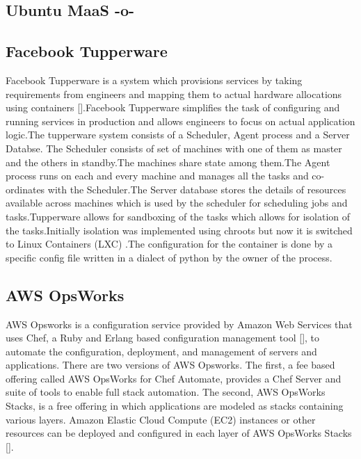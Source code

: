 \subsection{Ubuntu MaaS -o-}



\subsection{Facebook Tupperware}

Facebook Tupperware is a system which provisions services by taking
requirements from engineers and mapping them to actual hardware
allocations using containers [\cite{www-FaceTup}].Facebook Tupperware
simplifies the task of configuring and running services in production
and allows engineers to focus on actual application logic.The
tupperware system consists of a Scheduler, Agent process and a Server
Databse.  The Scheduler consists of set of machines with one of them
as master and the others in standby.The machines share state among
them.The Agent process runs on each and every machine and manages all
the tasks and co-ordinates with the Scheduler.The Server database
stores the details of resources available across machines which is
used by the scheduler for scheduling jobs and tasks.Tupperware allows
for sandboxing of the tasks which allows for isolation of the
tasks.Initially isolation was implemented using chroots but now it is
switched to Linux Containers (LXC) .The configuration for the
container is done by a specific config file written in a dialect of
python by the owner of the process.

\subsection{AWS OpsWorks}

AWS Opsworks is a configuration service provided by Amazon Web
Services that uses Chef, a Ruby and Erlang based configuration
management tool [\cite{www-wikichef}], to automate the configuration,
deployment, and management of servers and applications. There are two
versions of AWS Opsworks.  The first, a fee based offering called AWS
OpsWorks for Chef Automate, provides a Chef Server and suite of tools
to enable full stack automation. The second, AWS OpsWorks Stacks, is a
free offering in which applications are modeled as stacks containing
various layers. Amazon Elastic Cloud Compute (EC2) instances or other
resources can be deployed and configured in each layer of AWS OpsWorks
Stacks [\cite{www-awsopsworks}].

